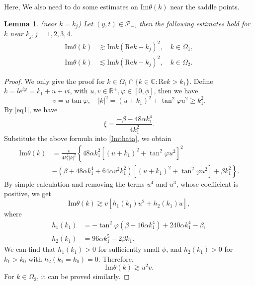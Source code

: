 \documentclass[11pt]{article}
\numberwithin{equation}{section}
\newtheorem{lemma}{Lemma}
\begin{document}
 Here, We also need to do some estimates on $\mathrm{Im}\theta(k)$ near the saddle points.

\begin{lemma}\label{p21}\textup{(}near $k=k_j$\textup{)}
     Let $(y,t)\in \mathcal{P}_{-}$, then the following estimates hold for $k$ near $k_j,j=1,2,3,4.$
     \begin{align*}
         \mathrm{Im}\theta(k)&\gtrsim  \mathrm{Im}k\left(\mathrm{Re}k-k_j\right)^2,\quad k\in\Omega_1,\\
         \mathrm{Im}\theta(k)&\lesssim  \mathrm{Im}k\left(\mathrm{Re}k-k_j\right)^2,\quad k\in\Omega_2.
     \end{align*}
\end{lemma}
\begin{proof}
    We only give the proof for $k\in\Omega_1\cap\{k\in\mathbb{C}:\mathrm{Re}k>k_1\}$. Define $k=le^{i\varphi}=k_1+u+vi$, with $u,v\in\mathbb{R}^+,\varphi\in[0,\phi]$, then we have
\begin{equation*}
    v=u\tan\varphi,\quad |k|^2=(u+k_1)^2+\tan ^2\varphi u^2\geqslant k_1^2.
\end{equation*}
By \eqref{eq1}, we have
\begin{equation}
    \xi=\frac{-\beta-48\alpha k_1^4}{4k_1^2}.
\end{equation}
Substitute the above formula into \eqref{Imthata}, we obtain
\begin{align*}
    \mathrm{Im}\theta(k)&=\frac{v}{4k_1^2|k|^2}\left\{48\alpha k_1^2[(u+k_1)^2+\tan ^2\varphi u^2]^2\right.\\
    &\left.-(\beta+48\alpha k_1^4+64\alpha v^2k_1^2)[(u+k_1)^2+\tan ^2\varphi u^2]+\beta k_1^2\right\}.
\end{align*}
By simple calculation and removing the terms $u^4$ and $u^3$, whose coefficient is positive, we get
\begin{equation}
    \mathrm{Im}\theta(k)\gtrsim v\left[h_1(k_1)u^2+h_2(k_1)u\right],
\end{equation}
where
\begin{align*}
    h_1(k_1)&=-\tan^2\varphi(\beta+16\alpha k_1^4)+240\alpha k_1^4-\beta,\\
    h_2(k_1)&=96\alpha k_1^5-2\beta k_1.
\end{align*}
We can find that $h_1(k_1)>0$ for sufficiently small $\phi$, and $h_2(k_1)>0$ for $k_1>k_0$ with $h_2(k_1=k_0)=0$. Therefore,
\begin{equation*}
    \mathrm{Im}\theta(k)\gtrsim  u^2v.
\end{equation*}
For $k\in\Omega_2$, it can be proved similarly.
\end{proof}
\end{document}
